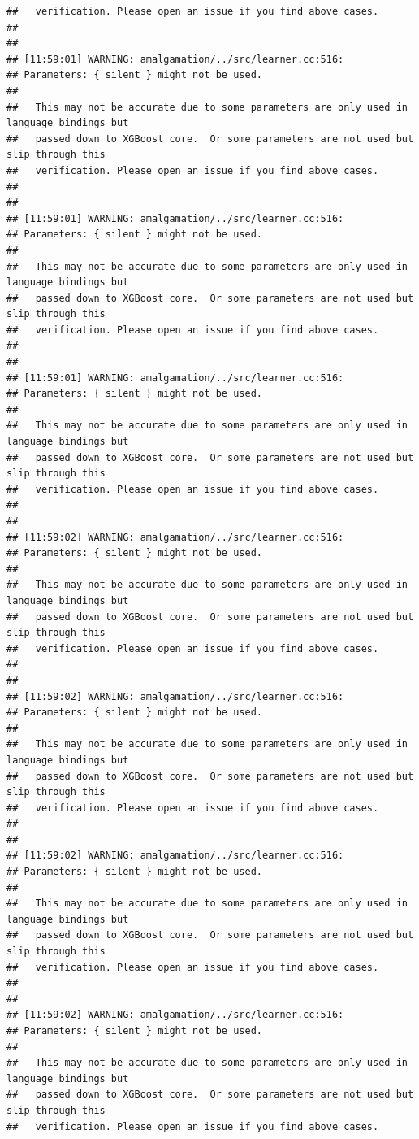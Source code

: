 \documentclass[AMS,STIX2COL]{WileyNJD-v2}\usepackage[]{graphicx}\usepackage[]{color}
\makeatletter
\newenvironment{kframe}{%
 \def\at@end@of@kframe{}%
 \ifinner\ifhmode%
  \def\at@end@of@kframe{\end{minipage}}%
  \begin{minipage}{\columnwidth}%
 \fi\fi%
 \def\FrameCommand##1{\hskip\@totalleftmargin \hskip-\fboxsep
 \colorbox{shadecolor}{##1}\hskip-\fboxsep
     \hskip-\linewidth \hskip-\@totalleftmargin \hskip\columnwidth}%
 \MakeFramed {\advance\hsize-\width
   \@totalleftmargin\z@ \linewidth\hsize
   \@setminipage}}%
 {\par\unskip\endMakeFramed%
 \at@end@of@kframe}
\newenvironment{knitrout}{}{} %
\makeatother
\begin{document}
\begin{knitrout}
\begin{kframe}
\begin{verbatim}
##   verification. Please open an issue if you find above cases.
## 
## 
## [11:59:01] WARNING: amalgamation/../src/learner.cc:516: 
## Parameters: { silent } might not be used.
## 
##   This may not be accurate due to some parameters are only used in language bindings but
##   passed down to XGBoost core.  Or some parameters are not used but slip through this
##   verification. Please open an issue if you find above cases.
## 
## 
## [11:59:01] WARNING: amalgamation/../src/learner.cc:516: 
## Parameters: { silent } might not be used.
## 
##   This may not be accurate due to some parameters are only used in language bindings but
##   passed down to XGBoost core.  Or some parameters are not used but slip through this
##   verification. Please open an issue if you find above cases.
## 
## 
## [11:59:01] WARNING: amalgamation/../src/learner.cc:516: 
## Parameters: { silent } might not be used.
## 
##   This may not be accurate due to some parameters are only used in language bindings but
##   passed down to XGBoost core.  Or some parameters are not used but slip through this
##   verification. Please open an issue if you find above cases.
## 
## 
## [11:59:02] WARNING: amalgamation/../src/learner.cc:516: 
## Parameters: { silent } might not be used.
## 
##   This may not be accurate due to some parameters are only used in language bindings but
##   passed down to XGBoost core.  Or some parameters are not used but slip through this
##   verification. Please open an issue if you find above cases.
## 
## 
## [11:59:02] WARNING: amalgamation/../src/learner.cc:516: 
## Parameters: { silent } might not be used.
## 
##   This may not be accurate due to some parameters are only used in language bindings but
##   passed down to XGBoost core.  Or some parameters are not used but slip through this
##   verification. Please open an issue if you find above cases.
## 
## 
## [11:59:02] WARNING: amalgamation/../src/learner.cc:516: 
## Parameters: { silent } might not be used.
## 
##   This may not be accurate due to some parameters are only used in language bindings but
##   passed down to XGBoost core.  Or some parameters are not used but slip through this
##   verification. Please open an issue if you find above cases.
## 
## 
## [11:59:02] WARNING: amalgamation/../src/learner.cc:516: 
## Parameters: { silent } might not be used.
## 
##   This may not be accurate due to some parameters are only used in language bindings but
##   passed down to XGBoost core.  Or some parameters are not used but slip through this
##   verification. Please open an issue if you find above cases.

\end{verbatim}
\end{kframe}
\end{knitrout}
\end{document}
